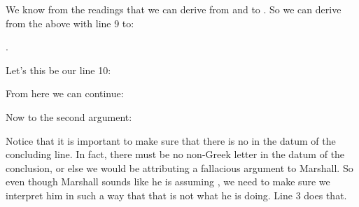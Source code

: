 { We know from the readings that we can derive from  
 and  to . So we can 
 derive from the above with line 9 to:

 .

Let's this be our line 10:

\begin{argument}


\end{argument}

From here we can continue:

\begin{argument}





\end{argument}


Now to the second argument:

\begin{argument*}







\end{argument*}

Notice that it is important to make sure that there is no  in the datum of 
the concluding line. In fact, there must be no non-Greek letter in the datum of 
the conclusion, or else we would be attributing a fallacious argument to 
Marshall.  So even though Marshall sounds like he is assuming , we need to 
make sure we interpret him in such a way that that is not what he is doing. Line 
3 does that.

}







